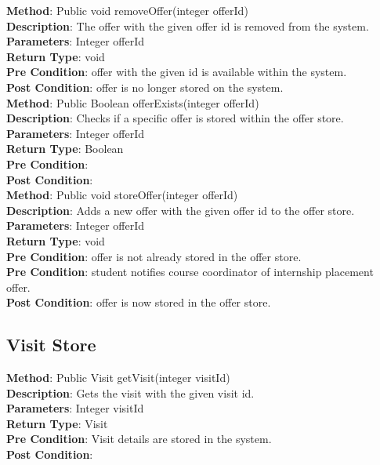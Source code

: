 \documentclass{l3deliverable}
\begin{document}
\textbf{Method}: Public void removeOffer(integer offerId)\\
\textbf{Description}: The offer with the given offer id is removed from the system. \\
\textbf{Parameters}: Integer offerId \\
\textbf{Return Type}: void\\
\textbf{Pre Condition}: offer with the given id is available within the system.\\
\textbf{Post Condition}: offer is no longer stored on the system.\\

\textbf{Method}: Public Boolean offerExists(integer offerId) \\
\textbf{Description}: Checks if a specific offer is stored within the offer store. \\
\textbf{Parameters}: Integer offerId\\
\textbf{Return Type}: Boolean\\
\textbf{Pre Condition}:\\
\textbf{Post Condition}:\\

\textbf{Method}: Public void storeOffer(integer offerId)\\
\textbf{Description}: Adds a new offer with the given offer id to the offer store. \\
\textbf{Parameters}: Integer offerId\\
\textbf{Return Type}: void\\
\textbf{Pre Condition}: offer is not already stored in the offer store.\\
\textbf{Pre Condition}: student notifies course coordinator of internship placement offer.\\
\textbf{Post Condition}: offer is now stored in the offer store.\\

\subsection{Visit Store}

\textbf{Method}: Public Visit getVisit(integer visitId)\\
\textbf{Description}: Gets the visit with the given visit id. \\
\textbf{Parameters}: Integer visitId\\
\textbf{Return Type}: Visit\\
\textbf{Pre Condition}: Visit details are stored in the system.\\
\textbf{Post Condition}:\\
\end{document}
